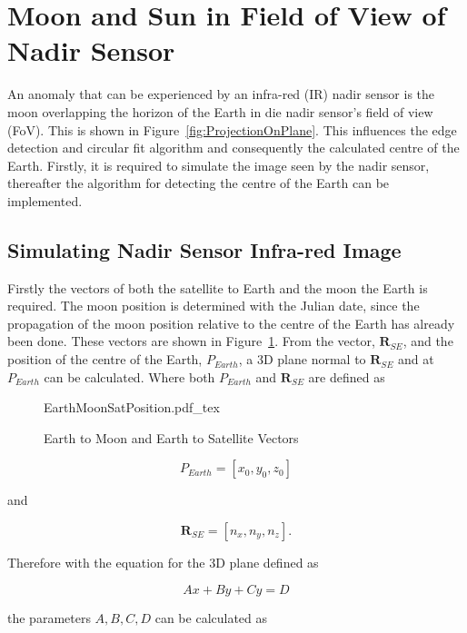 \section{Moon and Sun in Field of View of Nadir Sensor}
An anomaly that can be experienced by an infra-red (IR) nadir sensor is the moon overlapping the horizon of the Earth in die nadir sensor's field of view (FoV). This is shown in Figure~\ref{fig:ProjectionOnPlane}. This influences the edge detection and circular fit algorithm \cite{Wessels2018, Helgard2008} and consequently the calculated centre of the Earth. Firstly, it is required to simulate the image seen by the nadir sensor, thereafter the algorithm for detecting the centre of the Earth can be implemented.

\subsection{Simulating Nadir Sensor Infra-red Image}
Firstly the vectors of both the satellite to Earth and the moon the Earth is required. The moon position is determined with the Julian date, since the propagation of the moon position relative to the centre of the Earth has already been done. These vectors are shown in Figure~\ref{fig:EarthMoonSatPosition}. From the vector, $\mathbf{R}_{SE}$, and the position of the centre of the Earth, $P_{Earth}$, a 3D plane normal to $\mathbf{R}_{SE}$ and at $P_{Earth}$ can be calculated. Where both $P_{Earth}$ and $\mathbf{R}_{SE}$ are defined as

\begin{figure}[!htb]
	\centering
	\def\svgwidth{14cm}
	{EarthMoonSatPosition.pdf_tex}
	\caption{Earth to Moon and Earth to Satellite Vectors}
	\label{fig:EarthMoonSatPosition}
\end{figure}

\begin{equation}
	P_{Earth} = [x_0, y_0, z_0]
\end{equation}

and  

\begin{equation}
	\mathbf{R}_{SE} = [n_x, n_y, n_z].
\end{equation}

Therefore with the equation for the 3D plane defined as 

\begin{equation}
Ax + By + Cy = D
\end{equation}

the parameters $A, B, C, D$ can be calculated as

